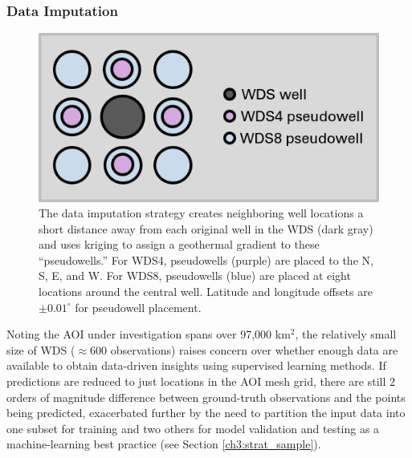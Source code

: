 \subsubsection{Data Imputation}\label{ch3:imputation}

\begin{figure}
\centering
\includegraphics[scale=0.9]{templates/images/Figure-ImputedWells.png}
\singlespacing
\caption[Data imputation strategy]{The data imputation strategy creates neighboring well locations a short distance away from each original well in the WDS (dark gray) and uses kriging to assign a geothermal gradient to these ``pseudowells.'' For WDS4, pseudowells (purple) are placed to the N, S, E, and W. For WDS8, pseudowells (blue) are placed at eight locations around the central well. Latitude and longitude offsets are $\pm0.01^\circ$ for pseudowell placement.}
\label{fig:data_imputation}
\end{figure}

Noting the AOI under investigation spans over 97,000 km$^2$, the relatively small size of WDS ($\approx600$ observations) raises concern over whether enough data are available to obtain data-driven insights using supervised learning methods. If predictions are reduced to just locations in the AOI mesh grid, there are still 2 orders of magnitude difference between ground-truth observations and the points being predicted, exacerbated further by the need to partition the input data into one subset for training and two others for model validation and testing as a machine-learning best practice \citep[e.g.,][p.\ 222]{hastie_elements_2009} (see Section \ref{ch3:strat_sample}). 

